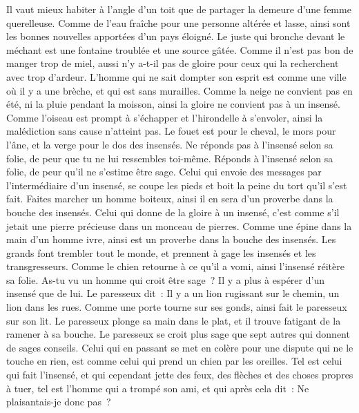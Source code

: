 \begin{multicols}{2}
Il vaut mieux habiter à l'angle d'un toit que de partager la demeure d'une femme querelleuse.
Comme de l'eau fraîche pour une personne altérée et lasse, ainsi sont les bonnes nouvelles apportées d'un pays éloigné.
Le juste qui bronche devant le méchant est une fontaine troublée et une source gâtée.
Comme il n'est pas bon de manger trop de miel, aussi n'y a-t-il pas de gloire pour ceux qui la recherchent avec trop d'ardeur.
L'homme qui ne sait dompter son esprit est comme une ville où il y a une brèche, et qui est sans murailles.
\VerseOne{}Comme la neige ne convient pas en été, ni la pluie pendant la moisson, ainsi la gloire ne convient pas à un insensé.
Comme l'oiseau est prompt à s'échapper et l'hirondelle à s'envoler, ainsi la malédiction sans cause n'atteint pas.
Le fouet est pour le cheval, le mors pour l'âne, et la verge pour le dos des insensés.
Ne réponds pas à l'insensé selon sa folie, de peur que tu ne lui ressembles toi-même.
Réponds à l'insensé selon sa folie, de peur qu'il ne s'estime être sage.
Celui qui envoie des messages par l'intermédiaire d'un insensé, se coupe les pieds et boit la peine du tort qu'il s'est fait.
Faites marcher un homme boiteux, ainsi il en sera d'un proverbe dans la bouche des insensés.
Celui qui donne de la gloire à un insensé, c'est comme s'il jetait une pierre précieuse dans un monceau de pierres.
Comme une épine dans la main d'un homme ivre, ainsi est un proverbe dans la bouche des insensés.
Les grands font trembler tout le monde, et prennent à gage les insensés et les transgresseurs.
Comme le chien retourne à ce qu'il a vomi, ainsi l'insensé réitère sa folie.
As-tu vu un homme qui croit être sage~? Il y a plus à espérer d'un insensé que de lui.
Le paresseux dit~: Il y a un lion rugissant sur le chemin, un lion dans les rues.
Comme une porte tourne sur ses gonds, ainsi fait le paresseux sur son lit.
Le paresseux plonge sa main dans le plat, et il trouve fatigant de la ramener à sa bouche.
Le paresseux se croit plus sage que sept autres qui donnent de sages conseils.
Celui qui en passant se met en colère pour une dispute qui ne le touche en rien, est comme celui qui prend un chien par les oreilles.
Tel est celui qui fait l'insensé, et qui cependant jette des feux, des flèches et des choses propres à tuer,
tel est l'homme qui a trompé son ami, et qui après cela dit~: Ne plaisantais-je donc pas~?

\end{multicols}
